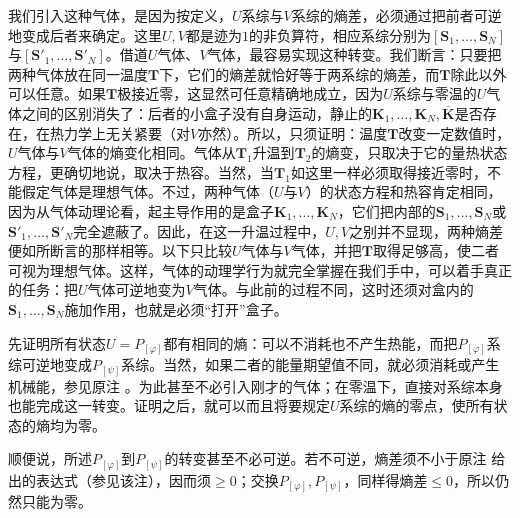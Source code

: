 \documentclass[fontsize=13pt,twoside,openany,headings=normal,parskip=false,bookmarkpackage=false,DIV=calc]{scrbook}
\begin{document}
我们引入这种气体，是因为按定义，$U$系综与$V$系综的熵差，必须通过把前者可逆地变成后者来确定。这里$U,\allowbreak V$都是迹为$1$的非负算符，相应系综分别为$[\boldsymbol{S}_1,\allowbreak \ldots,\allowbreak \boldsymbol{S}_N]$与$[\boldsymbol{S}'_1,\allowbreak \ldots,\allowbreak \boldsymbol{S}'_N]$。借道$U$气体、$V$气体，最容易实现这种转变。我们断言：只要把两种气体放在同一温度$\mathbf T$下，它们的熵差就恰好等于两系综的熵差，而$\mathbf T$除此以外可以任意。如果$\mathbf T$极接近零，这显然可任意精确地成立，因为$U$系综与零温的$U$气体之间的区别消失了：后者的小盒子没有自身运动，静止的$\boldsymbol{K}_1,\allowbreak \ldots,\allowbreak \boldsymbol{K}_N,\allowbreak \overline{\boldsymbol{K}}$是否存在，在热力学上无关紧要（对$V$亦然）。所以，只须证明：温度$\mathbf T$改变一定数值时，$U$气体与$V$气体的熵变化相同。气体从$\mathbf T_1$升温到$\mathbf T_2$的熵变，只取决于它的量热状态方程，更确切地说，取决于热容。当然，当$\mathbf T_1$如这里一样必须取得接近零时，不能假定气体是理想气体。不过，两种气体（$U$与$V$）的状态方程和热容肯定相同，因为从气体动理论看，起主导作用的是盒子$\boldsymbol{K}_1,\allowbreak \ldots,\allowbreak \boldsymbol{K}_N$，它们把内部的$\boldsymbol{S}_1,\allowbreak \ldots,\allowbreak \boldsymbol{S}_N$或$\boldsymbol{S}'_1,\allowbreak \ldots,\allowbreak \boldsymbol{S}'_N$完全遮蔽了。因此，在这一升温过程中，$U,\allowbreak V$之别并不显现，两种熵差便如所断言的那样相等。以下\hypertarget{origpage-194}{}\label{origpage-194}只比较$U$气体与$V$气体，并把$\mathbf T$取得足够高，使二者可视为理想气体。这样，气体的动理学行为就完全掌握在我们手中，可以着手真正的任务：把$U$气体可逆地变为$V$气体。与此前的过程不同，这时还须对盒内的$\boldsymbol{S}_1,\allowbreak \ldots,\allowbreak \boldsymbol{S}_N$施加作用，也就是必须“打开”盒子。

先证明所有状态$U=P_{[\varphi]}$都有相同的熵：可以不消耗也不产生热能，而把$P_{[\varphi]}$系综可逆地变成$P_{[\psi]}$系综。当然，如果二者的能量期望值不同，就必须消耗或产生机械能，参见原注 \hyperlink{note-185}{}。为此甚至不必引入刚才的气体；在零温下，直接对系综本身也能完成这一转变。证明之后，就可以而且将要规定$U$系综的熵的零点，使所有状态的熵均为零。

顺便说，所述$P_{[\varphi]}$到$P_{[\psi]}$的转变甚至不必可逆。若不可逆，熵差须不小于原注 \hyperlink{note-185}{} 给出的表达式（参见该注），因而须$\geq0$；交换$P_{[\varphi]},\allowbreak P_{[\psi]}$，同样得熵差$\leq0$，所以仍然只能为零。
\end{document}
